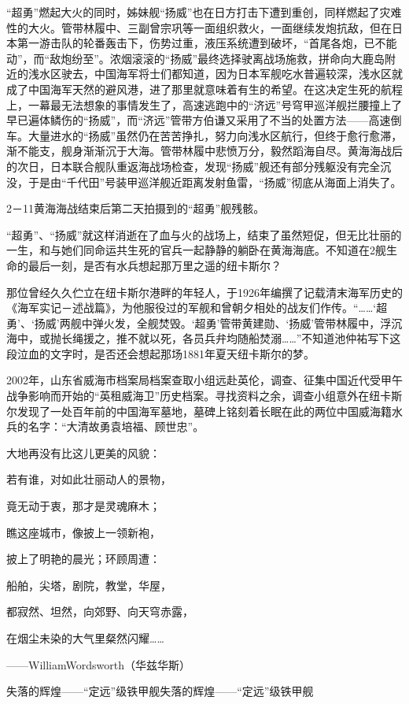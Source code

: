 \documentclass[12pt,UTF8]{ctexbook}
\begin{document}
“超勇”燃起大火的同时，姊妹舰“扬威”也在日方打击下遭到重创，同样燃起了灾难性的大火。管带林履中、三副曾宗巩等一面组织救火，一面继续发炮抗敌，但在日本第一游击队的轮番轰击下，伤势过重，液压系统遭到破坏，“首尾各炮，已不能动”，而“敌炮纷至”。浓烟滚滚的“扬威”最终选择驶离战场施救，拼命向大鹿岛附近的浅水区驶去，中国海军将士们都知道，因为日本军舰吃水普遍较深，浅水区就成了中国海军天然的避风港，进了那里就意味着有生的希望。在这决定生死的航程上，一幕最无法想象的事情发生了，高速逃跑中的“济远”号穹甲巡洋舰拦腰撞上了早已遍体鳞伤的“扬威”，而“济远”管带方伯谦又采用了不当的处置方法——高速倒车。大量进水的“扬威”虽然仍在苦苦挣扎，努力向浅水区航行，但终于愈行愈滞，渐不能支，舰身渐渐沉于大海。管带林履中悲愤万分，毅然蹈海自尽。黄海海战后的次日，日本联合舰队重返海战场检查，发现“扬威”舰还有部分残躯没有完全沉没，于是由“千代田”号装甲巡洋舰近距离发射鱼雷，“扬威”彻底从海面上消失了。

2－11黄海海战结束后第二天拍摄到的“超勇”舰残骸。

“超勇”、“扬威”就这样消逝在了血与火的战场上，结束了虽然短促，但无比壮丽的一生，和与她们同命运共生死的官兵一起静静的躺卧在黄海海底。不知道在2舰生命的最后一刻，是否有水兵想起那万里之遥的纽卡斯尔？

那位曾经久久伫立在纽卡斯尔港畔的年轻人，于1926年编撰了记载清末海军历史的《海军实记－述战篇》，为他服役过的军舰和曾朝夕相处的战友们作传。“……‘超勇’、‘扬威’两舰中弹火发，全舰焚毁。‘超勇’管带黄建勋、‘扬威’管带林履中，浮沉海中，或抛长绳援之，推不就以死，各员兵弁均随船焚溺……”不知道池仲祐写下这段泣血的文字时，是否还会想起那场1881年夏天纽卡斯尔的梦。

2002年，山东省威海市档案局档案查取小组远赴英伦，调查、征集中国近代受甲午战争影响而开始的“英租威海卫”历史档案。寻找资料之余，调查小组意外在纽卡斯尔发现了一处百年前的中国海军墓地，墓碑上铭刻着长眠在此的两位中国威海籍水兵的名字：“大清故勇袁培福、顾世忠”。

大地再没有比这儿更美的风貌：

若有谁，对如此壮丽动人的景物，

竟无动于衷，那才是灵魂麻木；

瞧这座城市，像披上一领新袍，

披上了明艳的晨光；环顾周遭：

船舶，尖塔，剧院，教堂，华屋，

都寂然、坦然，向郊野、向天穹赤露，

在烟尘未染的大气里粲然闪耀……

——WilliamWordsworth（华兹华斯）

失落的辉煌——“定远”级铁甲舰失落的辉煌——“定远”级铁甲舰
\end{document}
